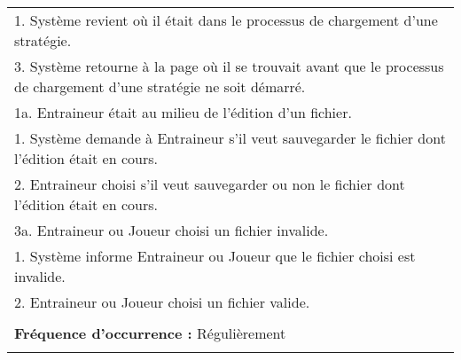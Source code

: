 \begin{longtable}{|p{16cm}|}
	\hspace{3cm}1. Système revient où il était dans le processus de chargement d'une stratégie.\\
	\hspace{1cm}3. Système retourne à la page où il se trouvait avant que le processus de chargement d'une stratégie ne soit démarré.\\
	1a. Entraineur était au milieu de l'édition d'un fichier.\\
	\hspace{1cm}1. Système demande à Entraineur s'il veut sauvegarder le fichier dont l'édition était en cours.\\
	\hspace{1cm}2. Entraineur choisi s'il veut sauvegarder ou non le fichier dont l'édition était en cours.\\
	3a. Entraineur ou Joueur choisi un fichier invalide.\\
	\hspace{1cm}1. Système informe Entraineur ou Joueur que le fichier choisi est invalide.\\
	\hspace{1cm}2. Entraineur ou Joueur choisi un fichier valide.\\
	\\
	\textbf{Fréquence d'occurrence :} Régulièrement\\
	\\
	\hline
\end{longtable}

